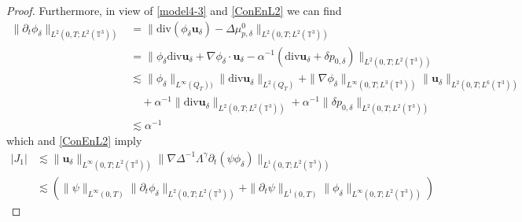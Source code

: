 \documentclass[10pt,a4paper]{amsart}
\begin{document}
\begin{proof}
				
				Furthermore, in view of \eqref{model4-3} and \eqref{ConEnL2} we can find
				\begin{align}\|\partial_{t}\phi_{\delta}\|_{L^{2}(0,T;L^{2}(\mathbb{T}^{3}))}&=\|\mathrm{div}(\phi_{\delta}  \mathbf{u}_{\delta})-\Delta\mu_{p,\delta}^{0}\|_{L^{2}(0,T;L^{2}(\mathbb{T}^{3}))}
					\nonumber\\&=\|\phi_{\delta}\mathrm{div}\mathbf{u}_{\delta}+\nabla\phi_{\delta}\cdot  \mathbf{u}_{\delta}-\alpha^{-1}(\mathrm{div}  \mathbf{u}_{\delta} +\delta p_{0,\delta})\|_{L^{2}(0,T;L^{2}(\mathbb{T}^{3}))}
					\nonumber\\&\lesssim \|\phi_{\delta}\|_{L^{\infty}(Q_T))}
					\|\mathrm{div}\mathbf{u}_{\delta}\|_{L^{2}(Q_T)}+\|\nabla\phi_{\delta}\|_{L^{\infty}(0,T;L^{3}(\mathbb{T}^{3}))}
					\|\mathbf{u}_{\delta}\|_{L^{2}(0,T;L^{6}(\mathbb{T}^{3}))}
					\nonumber\\& \quad+\alpha^{-1}\|\mathrm{div}  \mathbf{u}_{\delta}\|_{L^{2}(0,T;L^{2}(\mathbb{T}^{3}))}
					+\alpha^{-1}\|\delta p_{0,\delta}\|_{L^{2}(0,T;L^{2}(\mathbb{T}^{3}))}
					\nonumber\\&\lesssim \alpha^{-1}                  \label{uniform phi-alpha}
				\end{align}  which and \eqref{ConEnL2} imply
				\begin{align}
					\label{lemh55-7}
					\nonumber  |J_{1}|&
					\lesssim \|\mathbf{u}_{\delta}\|_{L^{\infty}(0,T;L^{2}(\mathbb{T}^{3}))}\|\nabla\Delta^{-1}\Lambda^{\gamma}\partial_t (\psi\phi_{\delta})\|_{L^{1}(0,T;L^{2}(\mathbb{T}^{3}))}
					\\& \nonumber\lesssim (\|\psi\|_{L^{\infty}(0,T)}\|\partial_t \phi_{\delta}\|_{L^{2}(0,T;L^{2}(\mathbb{T}^{3}))}+\|\partial_t\psi\|_{L^{1}(0,T)}\|\phi_{\delta}\|_{L^{\infty}(0,T;L^{2}(\mathbb{T}^{3}))})

\end{align}
\end{proof}
\end{document}
